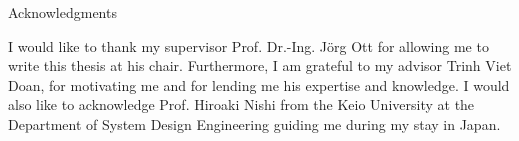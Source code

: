 \thispagestyle{empty}

\vspace*{20mm}

\begin{center}
{ Acknowledgments}
\end{center}

\vspace{10mm}

I would like to thank my supervisor Prof. Dr.-Ing. Jörg Ott for allowing me to write this thesis at his chair. Furthermore, I am grateful to my advisor Trinh Viet Doan, for motivating me and for lending me his expertise and knowledge. I would also like to acknowledge Prof. Hiroaki Nishi from the Keio University at the Department of System Design Engineering guiding me during my stay in Japan.

\vspace{10mm}

\cleardoublepage{}